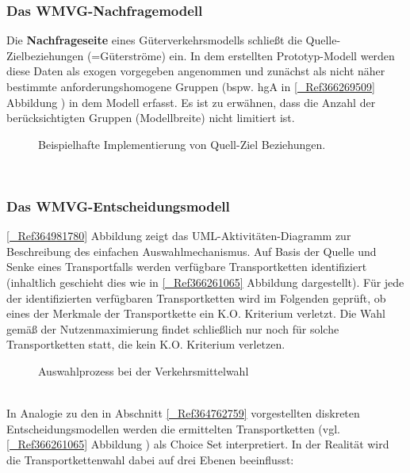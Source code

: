 % 
\subsubsection{Das WMVG-Nachfragemodell}
\label{_Toc366766118}
\label{_Toc366775312}
Die \textbf{Nachfrageseite} eines Güterverkehrsmodells schließt die Quelle- Zielbeziehungen (=Güterströme) ein. In dem erstellten Prototyp-Modell werden diese Daten als exogen vorgegeben angenommen und zunächst als nicht näher bestimmte anforderungshomogene Gruppen (bspw. hgA in \autoref{_Ref366269509} Abbildung ) in dem Modell erfasst. Es ist zu erwähnen, dass die Anzahl der berücksichtigten Gruppen (Modellbreite) nicht limitiert ist.~\\

\begin{figure}[htbp]
  \centering
  \caption{ Beispielhafte Implementierung von Quell-Ziel Beziehungen.}
  \label{_Ref366269509}
\end{figure}
~\\


% 
\subsubsection{Das WMVG-Entscheidungsmodell}
\label{_Toc366766119}
\label{_Toc366775313}
\autoref{_Ref364981780} Abbildung  zeigt das UML-Aktivitäten-Diagramm zur Beschreibung des einfachen Auswahlmechanismus. Auf Basis der Quelle und Senke eines Transportfalls werden verfügbare Transportketten identifiziert (inhaltlich geschieht dies wie in \autoref{_Ref366261065} Abbildung  dargestellt). Für jede der identifizierten verfügbaren Transportketten wird im Folgenden geprüft, ob eines der Merkmale der Transportkette ein K.O. Kriterium verletzt. Die Wahl gemäß der Nutzenmaximierung findet schließlich nur noch für solche Transportketten statt, die kein K.O. Kriterium verletzen.~\\

\begin{figure}[htbp]
  \centering
  \caption{ Auswahlprozess bei der Verkehrsmittelwahl}
  \label{_Ref364981780 _Ref364983053}
\end{figure}
~\\
In Analogie zu den in Abschnitt \autoref{_Ref364762759}  vorgestellten diskreten Entscheidungsmodellen werden die ermittelten Transportketten (vgl. \autoref{_Ref366261065} Abbildung ) als Choice Set interpretiert. In der Realität wird die Transportkettenwahl dabei auf drei Ebenen beeinflusst: ~\\

